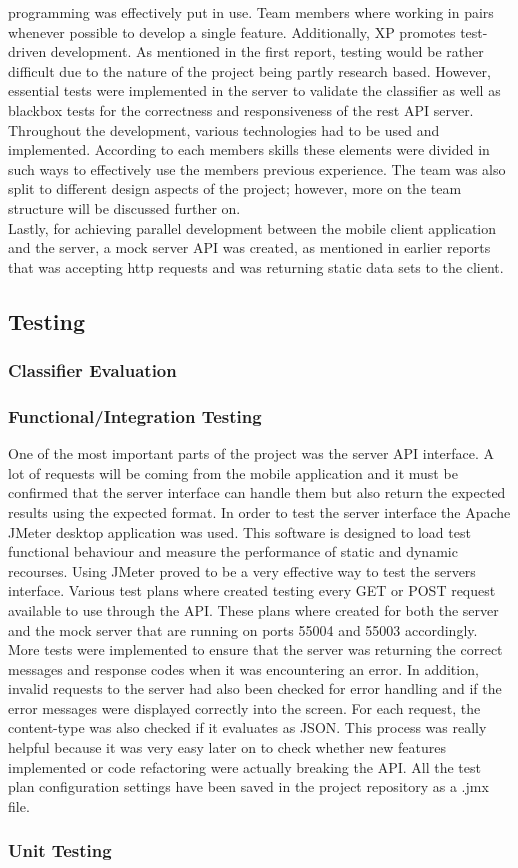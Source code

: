 programming was effectively put in use. Team members where working in pairs whenever possible to 
develop a single feature. Additionally, XP promotes test-driven development. As mentioned in the 
first report, testing would be rather difficult due to the nature of the project being partly 
research based. However, essential tests were implemented in the server to validate the classifier 
as well as blackbox tests for the correctness and responsiveness of the rest API server. \\ 
Throughout the development, various technologies had to be used and implemented. According to each 
members skills these elements were divided in such ways to effectively use the members previous 
experience. The team was also split to different design aspects of the project; however, more on the 
team structure will be discussed further on.\\ 
Lastly, for achieving parallel development between 
the mobile client application and the server, a mock server API was created, as mentioned in earlier 
reports that was accepting http requests and was returning static data sets to the client. 

\subsection{Testing} 
\subsubsection{Classifier Evaluation} 
\subsubsection{Functional/Integration Testing}
One of the most important parts of the project was the server API interface. A lot of requests will 
be coming from the mobile application and it must be confirmed that the server interface can handle 
them but also return the expected results using the expected format. In order to test the server 
interface the Apache JMeter desktop application was used. This software is designed to load test 
functional behaviour and measure the performance of static and dynamic recourses. Using JMeter 
proved to be a very effective way to test the servers interface. Various test plans where created 
testing every GET or POST request available to use through the API. These plans where created for 
both the server and the mock server that are running on ports 55004 and 55003 accordingly. More 
tests were implemented to ensure that the server was returning the correct messages and response 
codes when it was encountering an error. In addition, invalid requests to the server had also been 
checked for error handling and if the error messages were displayed correctly into the screen. For 
each request, the content-type was also checked if it evaluates as JSON. This process was really 
helpful because it was very easy later on to check whether new features implemented or code 
refactoring were actually breaking the API. All the test plan configuration settings have been saved 
in the project repository as a .jmx file. 

\subsubsection{Unit Testing} 

